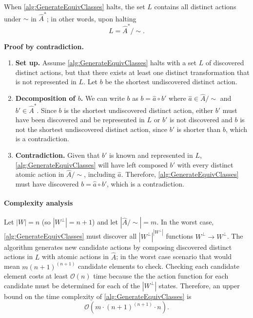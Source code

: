 \begin{propositionE}
    When \cref{alg:GenerateEquivClasses} halts, the set $L$ contains all distinct actions under $\sim$ in $\hat{A}^{*}$; in other words, upon halting
    \begin{equation}
        L = \hat{A}^{*}/\sim.
    \end{equation}
\end{propositionE}
\begin{proofE}
\textbf{Proof by contradiction.}
\begin{enumerate}
    \item \textbf{Set up.}
    Assume \cref{alg:GenerateEquivClasses} halts with a set $L$ of discovered distinct actions, but that there exists at least one distinct transformation that is not represented in $L$.
    Let $b$ be the shortest undiscovered distinct action.

    \item \textbf{Decomposition of $b$.}
    We can write $b$ as $b = \hat{a} \circ b'$ where $\hat{a} \in \hat{A}/\sim$ and $b' \in \hat{A}^{*}$.
    Since $b$ is the shortest undiscovered distinct action, either $b'$ must have been discovered and be represented in $L$ or $b'$ is not discovered and $b$ is not the shortest undiscovered distinct action, since $b'$ is shorter than $b$, which is a contradiction.

    \item \textbf{Contradiction.}
    Given that $b'$ is known and represented in $L$, \cref{alg:GenerateEquivClasses} will have left composed $b'$ with every distinct atomic action in $\hat{A}/\sim$, including $\hat{a}$.
    Therefore, \cref{alg:GenerateEquivClasses} must have discovered $b = \hat{a} \circ b'$, which is a contradiction.
\end{enumerate}
\end{proofE}


\paragraph{Complexity analysis}
Let $|W| = n$ (so $|W^{\bot}| = n+1$) and let $|\hat{A}/\sim| = m$.
In the worst case, \cref{alg:GenerateEquivClasses} must discover all $|W^{\bot}|^{|W^{\bot}|}$ functions $W^{\bot} \to W^{\bot}$.
The algorithm generates new candidate actions by composing discovered distinct actions in $L$ with atomic actions in $\hat{A}$; in the worst case scenario that would mean $m (n+1)^{(n+1)}$ candidate elements to check.
Checking each candidate element costs at least $\mathcal{O}(n)$ time because the the action function for each candidate must be determined for each of the $|W^{\bot}|$ states.
Therefore, an upper bound on the time complexity of \cref{alg:GenerateEquivClasses} is
\begin{equation}
    \mathcal{O}(m \cdot (n+1)^{(n+1)} \cdot n).
\end{equation}

